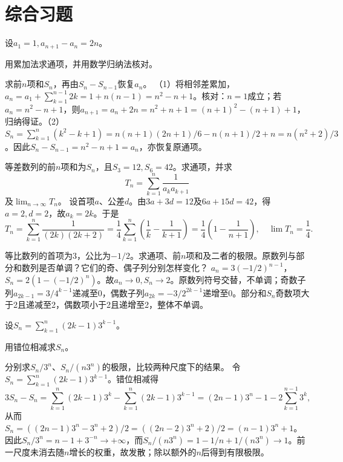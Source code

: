 \par\addvspace{12pt}

\section{综合习题}

\label{sol:sec:analysis:9}

设\(a_1=1,a_{n+1}-a_n=2n\)。

\quad {}用累加法求通项，并用数学归纳法核对。

\quad {}求前\(n\)项和\(S_n\)，再由\(S_n-S_{n-1}\)恢复\(a_n\)。
\solutionanswer
（1）将相邻差累加，\(a_n=a_1+\sum_{k=1}^{n-1}2k=1+n(n-1)=n^2-n+1\)。核对：\(n=1\)成立；若\(a_n=n^2-n+1\)，则\(a_{n+1}=a_n+2n=n^2+n+1=(n+1)^2-(n+1)+1\)，归纳得证。（2）\(S_n=\sum_{k=1}^n(k^2-k+1)=n(n+1)(2n+1)/6-n(n+1)/2+n=n(n^2+2)/3\)。因此\(S_n-S_{n-1}=n^2-n+1=a_n\)，亦恢复原通项。


等差数列的前\(n\)项和为\(S_n\)，且\(S_3=12,S_6=42\)。求通项，并求
\begin{equation*}
 T_n=\sum_{k=1}^n\frac1{a_ka_{k+1}}
\end{equation*}
及\(\lim_{n\to\infty}T_n\)。
\solutionanswer
设首项\(a\)、公差\(d\)。由\(3a+3d=12\)及\(6a+15d=42\)，得\(a=2,d=2\)，故\(a_k=2k\)。于是
\[T_n=\sum_{k=1}^n\frac1{(2k)(2k+2)}=\frac14\sum_{k=1}^n\left(\frac1k-\frac1{k+1}\right)=\frac14\left(1-\frac1{n+1}\right),\quad \lim T_n=\frac14.\]


等比数列的首项为\(3\)，公比为\(-1/2\)。求通项、前\(n\)项和及二者的极限。原数列与部分和数列是否单调？它们的奇、偶子列分别怎样变化？
\solutionanswer
\(a_n=3(-1/2)^{n-1}\)，\(S_n=2(1-(-1/2)^n)\)。故\(a_n\to0,S_n\to2\)。原数列符号交替，不单调；奇数子列\(a_{2k-1}=3/4^{k-1}\)递减至0，偶数子列\(a_{2k}=-3/2^{2k-1}\)递增至0。部分和\(S_n\)奇数项大于2且递减至2，偶数项小于2且递增至2，整体不单调。


设\(S_n=\sum_{k=1}^n(2k-1)3^{k-1}\)。

\quad {}用错位相减求\(S_n\)。

\quad {}分别求\(S_n/3^n\)、\(S_n/(n3^n)\)的极限，比较两种尺度下的结果。
\solutionanswer
令\(S_n=\sum_{k=1}^n(2k-1)3^{k-1}\)。错位相减得
\[3S_n-S_n=\sum_{k=1}^n(2k-1)3^k-\sum_{k=1}^n(2k-1)3^{k-1}=(2n-1)3^n-1-2\sum_{k=1}^{n-1}3^k,\]
从而\(S_n=((2n-1)3^n-3^n+2)/2=((2n-2)3^n+2)/2=(n-1)3^n+1\)。因此\(S_n/3^n=n-1+3^{-n}\to+\infty\)，而\(S_n/(n3^n)=1-1/n+1/(n3^n)\to1\)。前一尺度未消去随\(n\)增长的权重，故发散；除以额外的\(n\)后得到有限极限。


